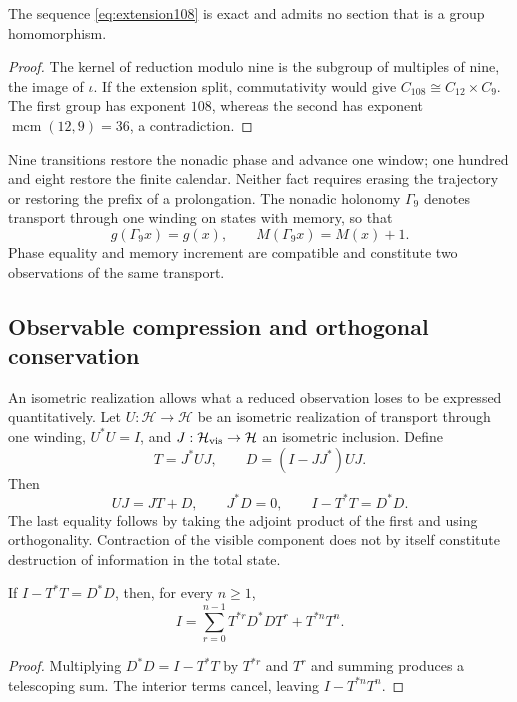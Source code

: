 \begin{proposition}
The sequence \eqref{eq:extension108} is exact and admits no section that is a group homomorphism.
\end{proposition}
\begin{proof}
The kernel of reduction modulo nine is the subgroup of multiples of nine, the image of \(\iota\). If the extension split, commutativity would give \(C_{108}\cong C_{12}\times C_9\). The first group has exponent \(108\), whereas the second has exponent \(\operatorname{mcm}(12,9)=36\), a contradiction.
\end{proof}

Nine transitions restore the nonadic phase and advance one window; one hundred and eight restore the finite calendar. Neither fact requires erasing the trajectory or restoring the prefix of a prolongation. The nonadic holonomy \(\Gamma_9\) denotes transport through one winding on states with memory, so that
\begin{equation}
 g(\Gamma_9x)=g(x),\qquad M(\Gamma_9x)=M(x)+1.
 \label{eq:holonomia-memoria}
\end{equation}
Phase equality and memory increment are compatible and constitute two observations of the same transport.


\subsection{Observable compression and orthogonal conservation}

An isometric realization allows what a reduced observation loses to be expressed quantitatively. Let \(U:\mathcal H\to\mathcal H\) be an isometric realization of transport through one winding, \(U^*U=I\), and \(J:\mathcal H_{\rm vis}\to\mathcal H\) an isometric inclusion. Define
\[
 T=J^*UJ,\qquad D=(I-JJ^*)UJ.
\]
Then
\begin{equation}
 UJ=JT+D,\qquad J^*D=0,\qquad I-T^*T=D^*D.
 \label{eq:conservacion-ortogonal}
\end{equation}
The last equality follows by taking the adjoint product of the first and using orthogonality. Contraction of the visible component does not by itself constitute destruction of information in the total state.

\begin{proposition}
If \(I-T^*T=D^*D\), then, for every \(n\ge1\),
\begin{equation}
 I=\sum_{r=0}^{n-1}T^{*r}D^*DT^r+T^{*n}T^n.
 \label{eq:telescopia}
\end{equation}
\end{proposition}
\begin{proof}
Multiplying \(D^*D=I-T^*T\) by \(T^{*r}\) and \(T^r\) and summing produces a telescoping sum. The interior terms cancel, leaving \(I-T^{*n}T^n\).
\end{proof}

